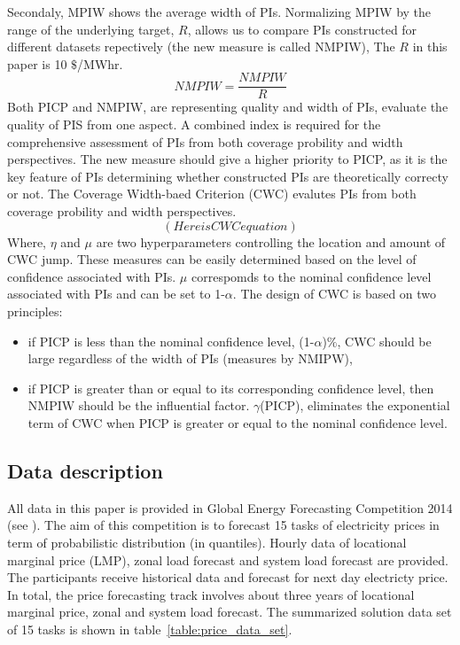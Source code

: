\documentclass[review]{elsarticle}
\begin{document}
        Secondaly, MPIW shows the average width of PIs.
        Normalizing MPIW by the range of the underlying target, $R$, allows us to compare PIs constructed for different datasets repectively (the new measure is called NMPIW),
        The $R$ in this paper is 10 $\$$/MWhr.
        \begin{equation}
          NMPIW = \frac{NMPIW}{R}
          \label{eq.NMPIW}
        \end{equation}
        Both PICP and NMPIW, are representing quality and width of PIs, evaluate the quality of PIS from one aspect.
        A combined index is required for the comprehensive assessment of PIs from both coverage probility and width perspectives.
        The new measure should give a higher priority to PICP, as it is the key feature of PIs determining whether constructed PIs are theoretically correcty or not.
        The Coverage Width-baed Criterion (CWC) evalutes PIs from both coverage probility and width perspectives.
        \begin{equation}
          (Here is CWC equation)
          \label{eq.CWC}
        \end{equation}
        Where, $\eta$ and $\mu$ are two hyperparameters controlling the location and amount of CWC jump.
        These measures can be easily determined based on the level of confidence associated with PIs.
        $\mu$ correspomds to the nominal confidence level associated with PIs and can be set to 1-$\alpha$.
        The design of CWC is based on two principles:

        \begin{itemize}
          \item if PICP is less than the nominal confidence level, (1-$\alpha$)$\%$, CWC should be large regardless of the width of PIs (measures by NMIPW),
          \item if PICP is greater than or equal to its corresponding confidence level, then NMPIW should be the influential factor.
          $\gamma$(PICP), eliminates the exponential term of CWC when PICP is greater or equal to the nominal confidence level.
        \end{itemize}

    \subsection{Data description}
      All data in this paper is provided in Global Energy Forecasting Competition 2014 (see \cite{Hong2016}).
      The aim of this competition is to forecast 15 tasks of electricity prices in term of probabilistic distribution (in quantiles).
      Hourly data of locational marginal price (LMP), zonal load forecast and system load forecast are provided.
      The participants receive historical data and forecast for next day electricty price.
      In total, the price forecasting track involves about three years of locational marginal price, zonal and system load forecast.
      The summarized solution data set of 15 tasks is shown in table~\ref{table:price_data_set}.
\end{document}
